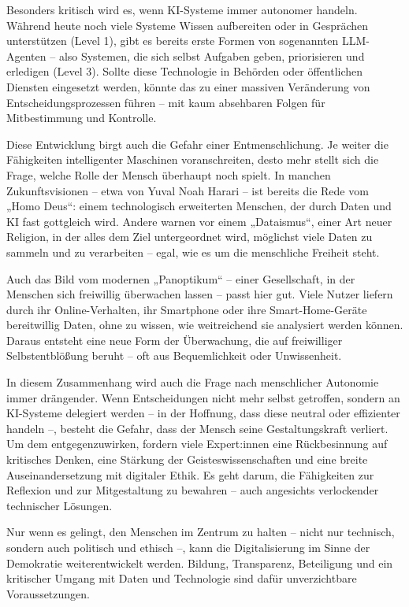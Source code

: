 \documentclass[utf8,biblatex]{bremerhaven_lni}
\begin{document}
Besonders kritisch wird es, wenn KI-Systeme immer autonomer handeln. Während heute noch viele Systeme Wissen aufbereiten oder in Gesprächen unterstützen (Level 1), gibt es bereits erste Formen von sogenannten LLM-Agenten – also Systemen, die sich selbst Aufgaben geben, priorisieren und erledigen (Level 3). Sollte diese Technologie in Behörden oder öffentlichen Diensten eingesetzt werden, könnte das zu einer massiven Veränderung von Entscheidungsprozessen führen – mit kaum absehbaren Folgen für Mitbestimmung und Kontrolle.

Diese Entwicklung birgt auch die Gefahr einer Entmenschlichung. Je weiter die Fähigkeiten intelligenter Maschinen voranschreiten, desto mehr stellt sich die Frage, welche Rolle der Mensch überhaupt noch spielt. In manchen Zukunftsvisionen – etwa von Yuval Noah Harari – ist bereits die Rede vom „Homo Deus“: einem technologisch erweiterten Menschen, der durch Daten und KI fast gottgleich wird. Andere warnen vor einem „Dataismus“, einer Art neuer Religion, in der alles dem Ziel untergeordnet wird, möglichst viele Daten zu sammeln und zu verarbeiten – egal, wie es um die menschliche Freiheit steht.

Auch das Bild vom modernen „Panoptikum“ – einer Gesellschaft, in der Menschen sich freiwillig überwachen lassen – passt hier gut. Viele Nutzer liefern durch ihr Online-Verhalten, ihr Smartphone oder ihre Smart-Home-Geräte bereitwillig Daten, ohne zu wissen, wie weitreichend sie analysiert werden können. Daraus entsteht eine neue Form der Überwachung, die auf freiwilliger Selbstentblößung beruht – oft aus Bequemlichkeit oder Unwissenheit.

In diesem Zusammenhang wird auch die Frage nach menschlicher Autonomie immer drängender. Wenn Entscheidungen nicht mehr selbst getroffen, sondern an KI-Systeme delegiert werden – in der Hoffnung, dass diese neutral oder effizienter handeln –, besteht die Gefahr, dass der Mensch seine Gestaltungskraft verliert. Um dem entgegenzuwirken, fordern viele Expert:innen eine Rückbesinnung auf kritisches Denken, eine Stärkung der Geisteswissenschaften und eine breite Auseinandersetzung mit digitaler Ethik. Es geht darum, die Fähigkeiten zur Reflexion und zur Mitgestaltung zu bewahren – auch angesichts verlockender technischer Lösungen.

Nur wenn es gelingt, den Menschen im Zentrum zu halten – nicht nur technisch, sondern auch politisch und ethisch –, kann die Digitalisierung im Sinne der Demokratie weiterentwickelt werden. Bildung, Transparenz, Beteiligung und ein kritischer Umgang mit Daten und Technologie sind dafür unverzichtbare Voraussetzungen.
\end{document}

